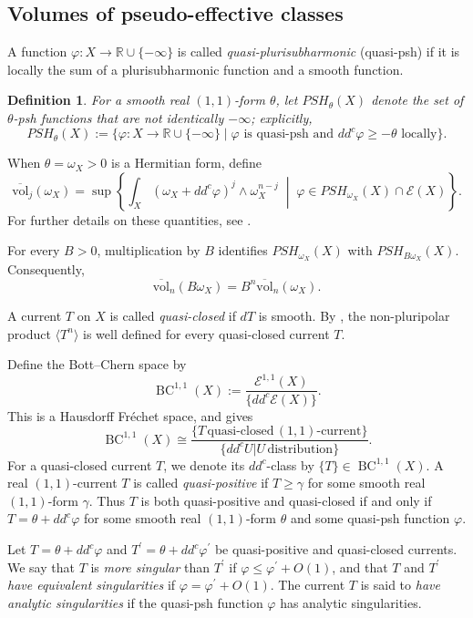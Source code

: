 \documentclass[11pt,letterpaper]{amsart}
\numberwithin{equation}{section}
\newcommand{\RR}{\mathbb{R}}
\newcommand{\cal}{\mathcal}
\def\cE{{\cal E}}
\DeclareMathOperator{\BC}{BC}
\DeclareMathOperator{\vol}{vol}
\newtheorem{defi}[prop]{Definition}
\def\beq{\begin{equation}}
\def\eeq{\end{equation}}
\def\vol{\text{vol}}
\begin{document}
\subsection{Volumes of pseudo-effective classes}


A function $\varphi:X\to\RR\cup\{-\infty\}$ is called \emph{quasi-plurisubharmonic} (quasi-psh) if it is locally the sum of a plurisubharmonic function and a smooth function.
\begin{defi}
For a smooth real $(1,1)$-form $\theta$, let $PSH_{\theta}(X)$ denote the set of $\theta$-psh functions that are not identically $-\infty$; explicitly,
$$
PSH_{\theta}(X):=\{\varphi:X\to\RR\cup\{-\infty\}\mid \varphi\text{ is quasi-psh and }dd^c\varphi\ge-\theta\text{ locally}\}.\nonumber
$$
\end{defi}


When $\theta=\omega_X>0$ is a Hermitian form, define
\begin{equation}\label{definition}
\overline{\vol}_j(\omega_X)=\sup\left\{\int_X(\omega_X+dd^c\varphi)^j\wedge\omega_X^{n-j}\;\middle|\;\varphi\in PSH_{\omega_X}(X)\cap\cE(X)\right\}.
\end{equation}
For further details on these quantities, see \cite[Section 3]{GL}.


For every $B>0$, multiplication by $B$ identifies $PSH_{\omega_X}(X)$ with $PSH_{B\omega_X}(X)$. Consequently,
\beq
\overline{\vol}_n(B\omega_X)=B^n\overline{\vol}_n(\omega_X).\nonumber
\eeq

A current $T$ on $X$ is called \emph{quasi-closed} if $dT$ is smooth. By \cite[Theorem 2.2]{BGL}, the non-pluripolar product $\langle T^n\rangle$ is well defined for every quasi-closed current $T$.

Define the Bott--Chern space by
\beq
\BC^{1,1}(X):=\frac{\cE^{1,1}(X)}{\{dd^c\cE(X)\}}.\nonumber
\eeq
This is a Hausdorff Fr\'echet space, and \cite[Section 1.1]{BGL} gives
\beq
\BC^{1,1}(X)\cong \frac{\{T\, \text{quasi-closed}\, \mbox{$(1, 1)$-{current}}\}}{\{dd^cU| U\,\text{distribution}\}}.\nonumber
\eeq
For a quasi-closed current $T$, we denote its $dd^c$-class by $\{T\}\in\BC^{1,1}(X)$. A real $(1,1)$-current $T$ is called \emph{quasi-positive} if $T\ge\gamma$ for some smooth real $(1,1)$-form $\gamma$. Thus $T$ is both quasi-positive and quasi-closed if and only if $T = \theta+dd^c\varphi$ for some smooth real $(1,1)$-form $\theta$ and some quasi-psh function $\varphi$.

Let $T=\theta+dd^c\varphi$ and $T^{\prime}=\theta+dd^c\varphi^{\prime}$ be quasi-positive and quasi-closed currents. We say that $T$ is \emph{more singular} than $T^{\prime}$ if $\varphi\le \varphi^{\prime}+O(1)$, and that $T$ and $T^{\prime}$ \emph{have equivalent singularities} if $\varphi= \varphi^{\prime}+O(1)$. The current $T$ is said to \emph{have analytic singularities} if the quasi-psh function $\varphi$ has analytic singularities.
\end{document}
